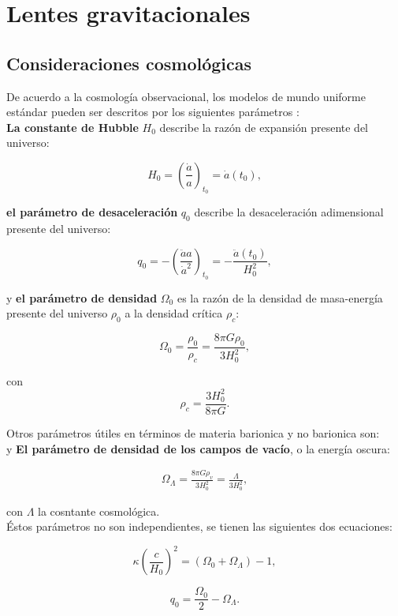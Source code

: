 \chapter{Lentes gravitacionales}

\section{Consideraciones cosmológicas}

De acuerdo a la cosmología observacional, los modelos de mundo uniforme estándar pueden ser descritos por los siguientes parámetros \cite{2008gafo.book.....L}:\\

\textbf{La constante de Hubble} $H_0$ describe la razón de expansión presente del universo:

$$ H_0 = \left( \frac{\dot{a}}{a} \right)_{t_0} = \dot{a}(t_0),$$

\textbf{el parámetro de desaceleración} $q_0$ describe la desaceleración adimensional presente del universo:

$$ q_0 = -\left( \frac{\ddot{a} a }{\dot{a}^2} \right)_{t_0} = -\frac{\ddot{a}(t_0)}{H_0^2}, $$

y \textbf{el parámetro de densidad} $\Omega_0$ es la razón de la densidad de masa-energía presente del universo $\rho_0$ a la densidad crítica $\rho_c$:

$$\Omega_0 = \frac{\rho_0}{\rho_c} = \frac{8\pi G\rho_0}{3H_0^2}, $$

con $$ \rho_c = \frac{3H_0^2}{8\pi G}. $$

Otros parámetros útiles en términos de materia barionica y no barionica son:\\

y \textbf{El parámetro de densidad de los campos de vacío}, o la energía oscura:

\begin{eqnarray}
\Omega_{\Lambda} = \frac{8\pi G \rho_v}{3 H_0^2} = \frac{\Lambda}{3H_0^2},
\end{eqnarray}

con $\Lambda$ la cosntante cosmológica.\\

Éstos parámetros no son independientes, se tienen las siguientes dos ecuaciones:

$$ \kappa \left( \frac{c}{H_0} \right)^2 = (\Omega_0 + \Omega_{\Lambda}) - 1, $$

$$ q_0 = \frac{\Omega_0}{2} - \Omega_{\Lambda}. $$

